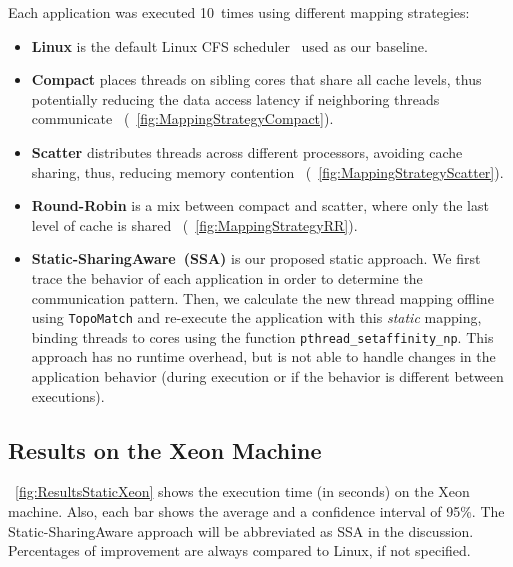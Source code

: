 Each application was executed 10~times using different mapping strategies:
\begin{itemize}
	\item \textbf{Linux} is the default Linux CFS scheduler~\cite{Wong:2008} used as our baseline.
	\item \textbf{Compact} places threads on sibling cores that share all cache levels, thus potentially reducing the data access latency if neighboring threads communicate~\cite{Castro:2014} (\figurename~\ref{fig:MappingStrategyCompact}).
	\item \textbf{Scatter} distributes threads across different processors, avoiding cache sharing, thus, reducing memory contention~\cite{Castro:2014} (\figurename~\ref{fig:MappingStrategyScatter}).
	\item \textbf{Round-Robin} is a mix between compact and scatter, where only the last level of cache is shared~\cite{Castro:2014} (\figurename~\ref{fig:MappingStrategyRR}).
	\item \textbf{Static-SharingAware~(SSA)} is our proposed static  approach. We first trace the behavior of each application in order to determine the communication pattern. Then, we calculate the new thread mapping offline using \texttt{TopoMatch} and re-execute the application with this \textit{static} mapping, binding threads to cores using the function \mbox{\texttt{pthread\_setaffinity\_np}}. This approach has no runtime overhead, but is not able to handle changes in the application behavior (during execution or if the behavior is different between executions).
\end{itemize}

\subsection{Results on the Xeon Machine}\label{sect:staticThreadMapXeon}

\figurename~\ref{fig:ResultsStaticXeon} shows the execution time (in seconds) on the Xeon machine. Also, each bar shows the average and a confidence interval of 95\%. The Static-SharingAware approach will be abbreviated as SSA in the discussion. Percentages of improvement are always compared to Linux, if not specified.

